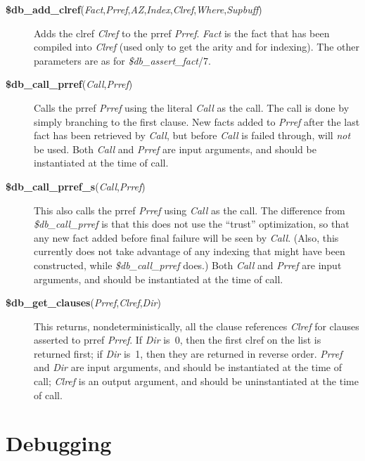 \begin{description}
\item[{\bf \$db\_add\_clref}({\em Fact},{\em Prref},{\em AZ},{\em Index},{\em Clref},{\em Where},{\em Supbuff})]
    Adds the clref {\em Clref} to the prref {\em Prref}.
    {\em Fact} is the fact that has been compiled into {\em Clref}
    (used only to get the arity and for indexing).
    The other parameters are as for {\em \$db\_assert\_fact}/7.

\item[{\bf \$db\_call\_prref}({\em Call},{\em Prref})]
    Calls the prref {\em Prref} using the literal {\em Call} as the call.
    The call is done by simply branching to the first clause.
    New facts added to {\em Prref} after the last fact has been retrieved
    by {\em Call}, but before {\em Call} is failed through, will {\em not}
    be used.
    Both {\em Call} and {\em Prref} are input arguments,
    and should be instantiated at the time of call.

\item[{\bf \$db\_call\_prref\_s}({\em Call},{\em Prref})]
    This also calls the prref {\em Prref} using {\em Call} as the call.
    The difference from {\em \$db\_call\_prref} is that this does not use
    the ``trust'' optimization, so that any new fact added
    before final failure will be seen by {\em Call}.
    (Also, this currently does not take advantage of any indexing
    that might have been constructed,
    while {\em \$db\_call\_prref} does.)
    Both {\em Call} and {\em Prref} are input arguments,
    and should be instantiated at the time of call.

\item[{\bf \$db\_get\_clauses}({\em Prref},{\em Clref},{\em Dir})]
    This returns, nondeterministically, all the clause references {\em Clref}
    for clauses asserted to prref {\em Prref}.
    If {\em Dir} is~0, then the first clref on the list is returned first;
    if {\em Dir} is~1, then they are returned in reverse order.
    {\em Prref} and {\em Dir} are input arguments,
    and should be instantiated at the time of call;
    {\em Clref} is an output argument,
    and should be uninstantiated at the time of call.
\end{description}

\section{Debugging}\label{debugging}
